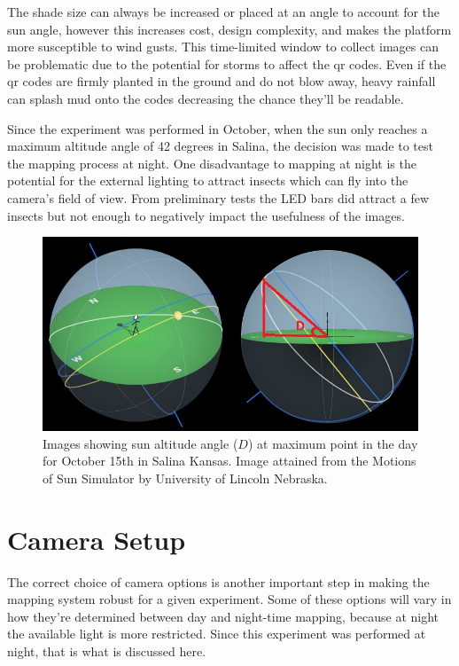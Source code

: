 The shade size can always be increased or placed at an angle to account for the sun angle, however this increases cost, design complexity, and makes the platform more susceptible to wind gusts.  This time-limited window to collect images can be problematic due to the potential for storms to affect the \ac{qr} codes.  Even if the \ac{qr} codes are firmly planted in the ground and do not blow away, heavy rainfall can splash mud onto the codes decreasing the chance they'll be readable. 

Since the experiment was performed in October, when the sun only reaches a maximum altitude angle of 42 degrees in Salina, the decision was made to test the mapping process at night.  One disadvantage to mapping at night is the potential for the external lighting to attract insects which can fly into the camera's field of view.  From preliminary tests the LED bars did attract a few insects but not enough to negatively impact the usefulness of the images.

\begin{figure}
	\centering
    \includegraphics[width=5in]{figures/sun_angle2.jpg}
    \caption[Sun angle]{Images showing sun altitude angle ($D$) at maximum point in the day for October 15th in Salina Kansas.  Image attained from the Motions of Sun Simulator by University of Lincoln Nebraska.}
    \label{figure:sun_angle}
\end{figure}  

\section{Camera Setup}

The correct choice of camera options is another important step in making the mapping system robust for a given experiment.  Some of these options will vary in how they're determined between day and night-time mapping, because at night the available light is more restricted.  Since this experiment was performed at night, that is what is discussed here.

